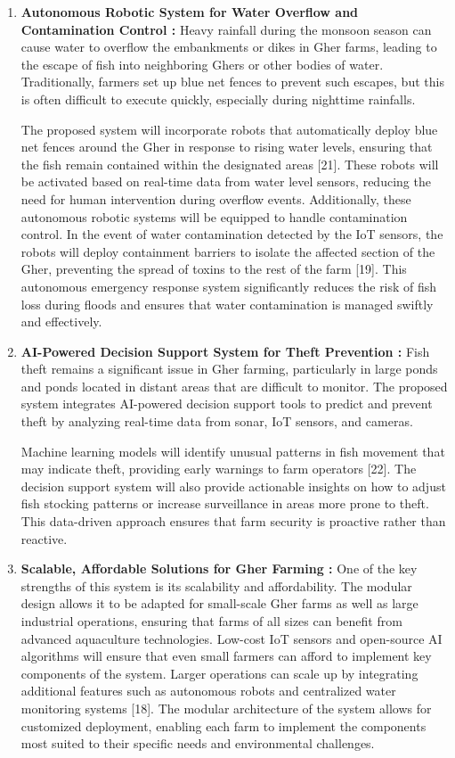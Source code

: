 \documentclass[conference]{IEEEtran}
\begin{document}
\begin{enumerate}
	\item \textbf{Autonomous Robotic System for Water Overflow and Contamination Control : }
	Heavy rainfall during the monsoon season can cause water to overflow the embankments or dikes in Gher farms, leading to the escape of fish into neighboring Ghers or other bodies of water. Traditionally, farmers set up blue net fences to prevent such escapes, but this is often difficult to execute quickly, especially during nighttime rainfalls.
	
The proposed system will incorporate robots that automatically deploy blue net fences around the Gher in response to rising water levels, ensuring that the fish remain contained within the designated areas [21]. These robots will be activated based on real-time data from water level sensors, reducing the need for human intervention during overflow events. Additionally, these autonomous robotic systems will be equipped to handle contamination control. In the event of water contamination detected by the IoT sensors, the robots will deploy containment barriers to isolate the affected section of the Gher, preventing the spread of toxins to the rest of the farm [19]. This autonomous emergency response system significantly reduces the risk of fish loss during floods and ensures that water contamination is managed swiftly and effectively.
	
	
	\item \textbf{ AI-Powered Decision Support System for Theft Prevention : }
Fish theft remains a significant issue in Gher farming, particularly in large ponds and ponds located in distant areas that are difficult to monitor. The proposed system integrates AI-powered decision support tools to predict and prevent theft by analyzing real-time data from sonar, IoT sensors, and cameras.

Machine learning models will identify unusual patterns in fish movement that may indicate theft, providing early warnings to farm operators [22]. The decision support system will also provide actionable insights on how to adjust fish stocking patterns or increase surveillance in areas more prone to theft. This data-driven approach ensures that farm security is proactive rather than reactive.
	
	
	\item \textbf{ Scalable, Affordable Solutions for Gher Farming : }
One of the key strengths of this system is its scalability and affordability. The modular design allows it to be adapted for small-scale Gher farms as well as large industrial operations, ensuring that farms of all sizes can benefit from advanced aquaculture technologies. Low-cost IoT sensors and open-source AI algorithms will ensure that even small farmers can afford to implement key components of the system. Larger operations can scale up by integrating additional features such as autonomous robots and centralized water monitoring systems [18]. The modular architecture of the system allows for customized deployment, enabling each farm to implement the components most suited to their specific needs and environmental challenges.
	

\end{enumerate}
\end{document}
